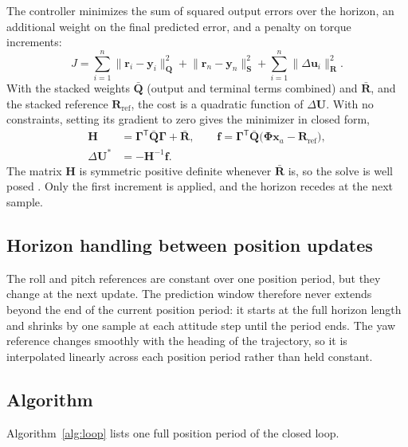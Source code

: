 \documentclass[11pt,a4paper]{article}
\numberwithin{equation}{section}
\newcommand{\vect}[1]{\mathbf{#1}}
\begin{document}
The controller minimizes the sum of squared output errors over the horizon, an additional weight on the final predicted error, and a penalty on torque increments:
\begin{equation}
J=\sum_{i=1}^{n}\big\|\vect{r}_i-\vect{y}_i\big\|^2_{\vect{Q}}
+\big\|\vect{r}_n-\vect{y}_n\big\|^2_{\vect{S}}
+\sum_{i=1}^{n}\|\Delta\vect{u}_i\|^2_{\vect{R}} .
\end{equation}
With the stacked weights $\bar{\vect{Q}}$ (output and terminal terms combined) and $\bar{\vect{R}}$, and the stacked reference $\vect{R}_{\mathrm{ref}}$, the cost is a quadratic function of $\Delta\vect{U}$. With no constraints, setting its gradient to zero gives the minimizer in closed form,
\begin{equation}
\boxed{
\begin{aligned}
\vect{H}&=\boldsymbol{\Gamma}^{\mathsf T}\bar{\vect{Q}}\boldsymbol{\Gamma}+\bar{\vect{R}},\qquad
\vect{f}=\boldsymbol{\Gamma}^{\mathsf T}\bar{\vect{Q}}\big(\boldsymbol{\Phi}\vect{x}_a-\vect{R}_{\mathrm{ref}}\big),\\
\Delta\vect{U}^\ast&=-\vect{H}^{-1}\vect{f}.
\end{aligned}}
\end{equation}
The matrix $\vect{H}$ is symmetric positive definite whenever $\bar{\vect{R}}$ is, so the solve is well posed \cite{rawlings2017}. Only the first increment is applied, and the horizon recedes at the next sample.

\subsection{Horizon handling between position updates}

The roll and pitch references are constant over one position period, but they change at the next update. The prediction window therefore never extends beyond the end of the current position period: it starts at the full horizon length and shrinks by one sample at each attitude step until the period ends. The yaw reference changes smoothly with the heading of the trajectory, so it is interpolated linearly across each position period rather than held constant.

\subsection{Algorithm}

Algorithm~\ref{alg:loop} lists one full position period of the closed loop.
\end{document}
